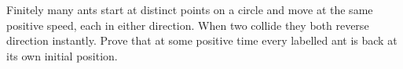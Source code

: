 Finitely many ants start at distinct points on a circle and move at the same positive speed, each in either direction. When two collide they both reverse direction instantly. Prove that at some positive time every labelled ant is back at its own initial position.
